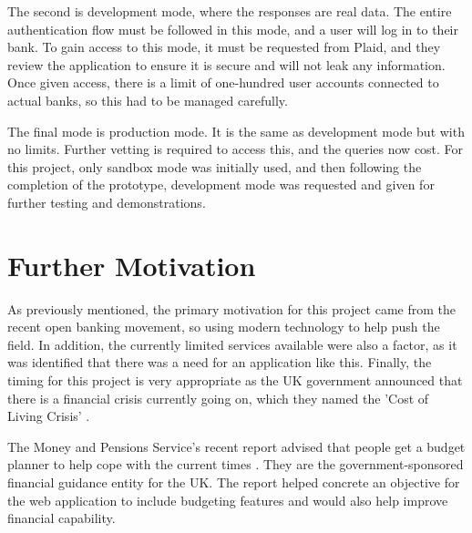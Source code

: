 The second is development mode, where the responses are real data. The entire authentication flow must be followed in this mode, and a user will log in to their bank. To gain access to this mode, it must be requested from Plaid, and they review the application to ensure it is secure and will not leak any information. Once given access, there is a limit of one-hundred user accounts connected to actual banks, so this had to be managed carefully.

The final mode is production mode. It is the same as development mode but with no limits. Further vetting is required to access this, and the queries now cost. For this project, only sandbox mode was initially used, and then following the completion of the prototype, development mode was requested and given for further testing and demonstrations.

\section{Further Motivation}
\label{sec:further-motivation}
As previously mentioned, the primary motivation for this project came from the recent open banking movement, so using modern technology to help push the field. In addition, the currently limited services available were also a factor, as it was identified that there was a need for an application like this. Finally, the timing for this project is very appropriate as the UK government announced that there is a financial crisis currently going on, which they named the 'Cost of Living Crisis' \cite{CostOfLivingCrisisGov}.

The Money and Pensions Service's recent report advised that people get a budget planner to help cope with the current times \cite{MaPS}. They are the government-sponsored financial guidance entity for the UK. The report helped concrete an objective for the web application to include budgeting features and would also help improve financial capability.